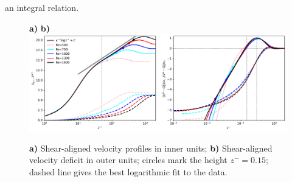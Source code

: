 \documentclass[smallcondensed,final]{svjour3}
\begin{document}
an integral relation. 
%
\par
%
\begin{figure}
  \begin{flushleft}
    \textbf{a)}\hspace{0.47\textwidth} \textbf{b)}\\
    \includegraphics[width=\textwidth]{../plot/uv_innerouter.pdf}\\
    \caption{
      \textbf{a)} Shear-aligned velocity profiles in inner units;
      \textbf{b)} Shear-aligned velocity deficit in outer units; circles mark the
      height $z^-=0.15$; dashed line gives the best logarithmic fit to the data. 
      \label{fig:profiles}
    }
  \end{flushleft}
\end{figure}
\end{document}
